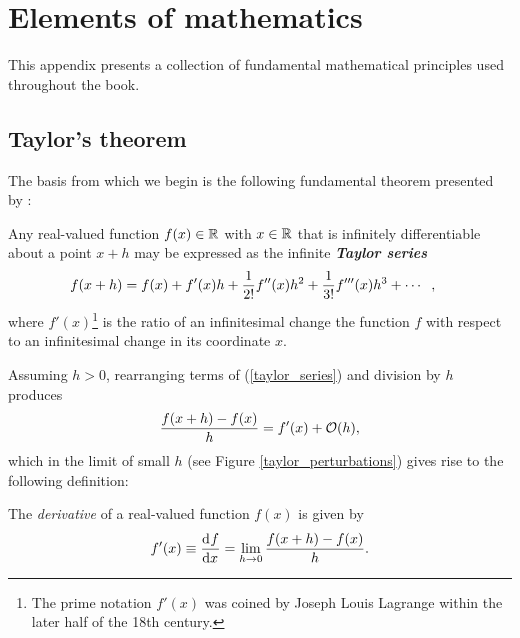 
\chapter{Elements of mathematics} \label{ssn_elemnets_of_mathematics}

This appendix presents a collection of fundamental mathematical principles used throughout the book.

\section{Taylor's theorem} \label{ssn_taylor_theorem}

The basis from which we begin is the following fundamental theorem presented by \citet{taylor_1715}:
\begin{theorem}
\label{taylors_theorem}
Any real-valued function $f(x) \in \mathbb{R}$ with $x \in \mathbb{R}$ that is infinitely differentiable about a point $x+h$ may be expressed as the infinite \textbf{\emph{Taylor series}}
\begin{align}
  \label{taylor_series}
  f(x+h) &= f(x) + f'(x) h + \frac{1}{2!} f''(x) h^2 + \frac{1}{3!} f'''(x) h^3 + \cdots \hspace{2mm},
\end{align}
where $f'(x)$\footnote{The prime notation $f'(x)$ was coined by Joseph Louis Lagrange within the later half of the 18th century.} is the ratio of an infinitesimal change the function $f$ with respect to an infinitesimal change in its coordinate $x$.
\end{theorem}

Assuming $h>0$, rearranging terms of (\ref{taylor_series}) and division by $h$ produces
\begin{align}
  \label{intermediate_derivative}
  \frac{ f(x+h) - f(x) }{h} = f'(x) + \mathcal{O}(h),
\end{align}
which in the limit of small $h$ (see Figure \ref{taylor_perturbations}) gives rise to the following definition:
\begin{definition}[Derivative]
\label{derivative}
The \emph{derivative} of a real-valued function $f(x)$ is given by 
\begin{align*}
  f'(x) \equiv \frac{\mathrm{d}{^{}} f}{\mathrm{d} x{^{}} } = \lim_{h \rightarrow 0} \frac{ f(x+h) - f(x) }{h}.
\end{align*}
\end{definition}


